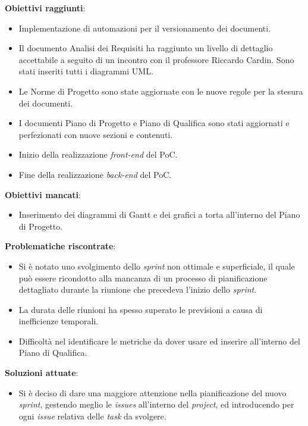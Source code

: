 \textbf{Obiettivi raggiunti}:
\begin{itemize}
	\item Implementazione di automazioni per il versionamento dei documenti.
	\item Il documento Analisi dei Requisiti ha raggiunto un livello di dettaglio accettabile a seguito di un incontro con il professore Riccardo Cardin.
		  Sono stati inseriti tutti i diagrammi UML\g.
	\item Le Norme di Progetto sono state aggiornate con le nuove regole per la stesura dei documenti.
	\item I documenti Piano di Progetto e Piano di Qualifica sono stati aggiornati e perfezionati con nuove sezioni e contenuti.
	\item Inizio della realizzazione \textit{front-end} del PoC.
	\item Fine della realizzazione \textit{back-end} del PoC.
\end{itemize}

\textbf{Obiettivi mancati}:
\begin{itemize}
	\item Inserimento dei diagrammi di Gantt e dei grafici a torta all'interno del Piano di Progetto.
\end{itemize}

\textbf{Problematiche riscontrate}:
\begin{itemize}
	\item Si è notato uno svolgimento dello \textit{sprint} non ottimale e superficiale, il quale può essere ricondotto alla mancanza di un processo di pianificazione 
	dettagliato durante la riunione che precedeva l'inizio dello \textit{sprint}.
	\item La durata delle riunioni ha spesso superato le previsioni a causa di inefficienze temporali.
	\item Difficoltà nel identificare le metriche da dover usare ed inserire all'interno del Piano di Qualifica.
\end{itemize}

\textbf{Soluzioni attuate}:
\begin{itemize}
	\item Si è deciso di dare una maggiore attenzione nella pianificazione del nuovo \textit{sprint}, gestendo meglio le \textit{issues} all'interno del \textit{project}, ed introducendo per ogni
	\textit{issue} relativa delle \textit{task} da svolgere.
\end{itemize}




